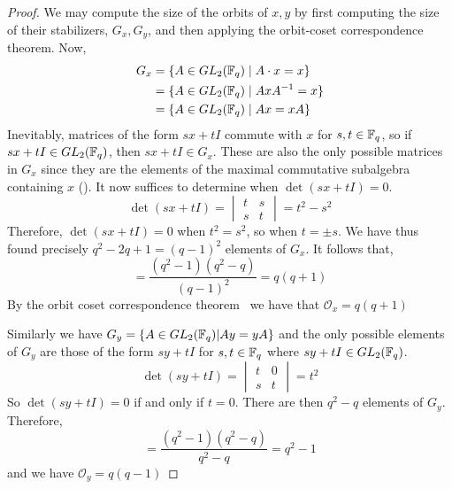 \documentclass{amsart}
\begin{document}
\begin{proof}
    We may compute the size of the orbits of $x, y$ by first computing the size of their stabilizers, $G_x, G_y$, and then applying the orbit-coset correspondence theorem.
    Now,
    \begin{align*}
        G_x &= \{A \in GL_2(\protect\mathbb{F}_q) \mid A \cdot x = x\} \\
            &= \{A \in GL_2(\protect\mathbb{F}_q) \mid AxA^{-1} = x\} \\
            &= \{A \in GL_2(\protect\mathbb{F}_q) \mid Ax = xA\} 
    \end{align*}
    Inevitably, matrices of the form $sx + tI$ commute with $x$ for $s,t \in \protect\mathbb{F}_q$, so if $sx + tI \in GL_2(\protect\mathbb{F}_q)$, then $sx + tI \in G_x$. These are also the only possible matrices in $G_x$ since they are the elements of the maximal commutative subalgebra containing $x$ (). It now suffices to determine when $\det(sx + tI) = 0$.
    \begin{equation*}
        \det(sx+tI) =
        \begin{vmatrix}
            t & s \\
            s & t
        \end{vmatrix} = t^2 - s^2
    \end{equation*}
    Therefore, $\det(sx + tI) = 0$ when $t^2 = s^2$, so when $t = \pm s$. We have thus found precisely $q^2 - 2q + 1 = (q-1)^2$ elements of $G_x$. It follows that,
    \begin{equation*}
        [GL_2(\bF_q) : G_x] = \frac{(q^2-1)(q^2-q)}{(q-1)^2} = q(q + 1)
    \end{equation*}
    By the orbit coset correspondence theorem~\cite{DandF} we have that $\mathcal{O}_x = q(q + 1)$

    Similarly we have $G_y = \{A \in GL_2(\protect\mathbb{F}_q) | Ay = yA\}$ and the only possible elements of $G_y$ are those of the form $sy + tI$ for $s,t \in \protect\mathbb{F}_q$ where $sy+tI \in GL_2(\protect\mathbb{F}_q)$.
    \begin{equation*}
        \det(sy+tI) =
        \begin{vmatrix}
            t & 0 \\
            s & t
        \end{vmatrix} = t^2
    \end{equation*}
    So $\det(sy + tI) = 0$ if and only if $t = 0$. There are then $q^2 - q$ elements of $G_y$. Therefore,
    \begin{equation*}
        [GL_2(\bF_q) : G_y] = \frac{(q^2-1)(q^2-q)}{q^2 - q} = q^2 - 1
    \end{equation*}
    and we have $\mathcal{O}_y = q(q - 1)$
\end{proof}
\end{document}
